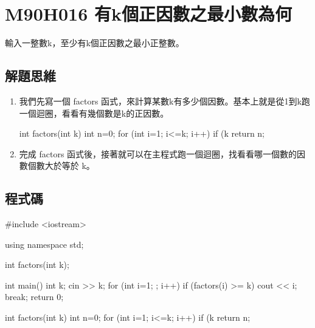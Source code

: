 \section{M90H016 有k個正因數之最小數為何}
輸入一整數k，至少有k個正因數之最小正整數。
\subsection{解題思維}

\begin{enumerate}
	\item
	我們先寫一個 factors 函式，來計算某數k有多少個因數。基本上就是從1到k跑一個迴圈，看看有幾個數是k的正因數。
	\begin{inside}
	int factors(int k) {
		int n=0;
		for (int i=1; i<=k; i++) {
			if (k%
		}
		return n;
	}
	\end{inside}
	\item
	完成 factors 函式後，接著就可以在主程式跑一個迴圈，找看看哪一個數的因數個數大於等於 k。
\end{enumerate} 

\subsection{程式碼}
\begin{cppcode}
	#include <iostream>

	using namespace std;
	
	int factors(int k);
	
	int main()
	{
		int k;
		cin >> k;
		for (int i=1; ; i++) {
			if (factors(i) >= k) {
				cout << i;
				break;
			}
		}
		return 0;
	}
	
	int factors(int k) {
		int n=0;
		for (int i=1; i<=k; i++) {
			if (k%
		}
		return n;
	}
\end{cppcode}
